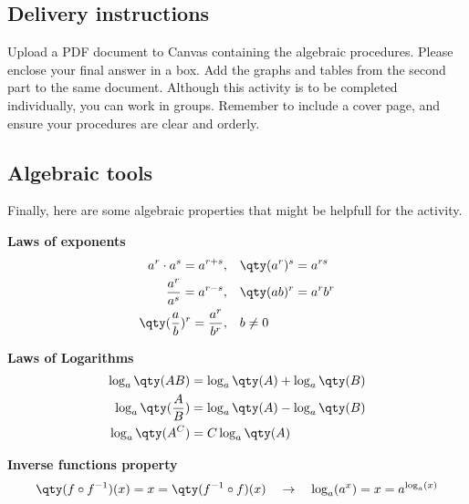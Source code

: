 \documentclass[../main.tex]{subfiles}
\begin{document}
\subsection{Delivery instructions}

Upload a PDF document to Canvas containing the algebraic procedures.
Please enclose your final answer in a box.
Add the graphs and tables from the second part to the same document.
Although this activity is to be completed individually, you can work in groups.
Remember to include a cover page, and ensure your procedures are clear and orderly.

\subsection{Algebraic tools}

Finally, here are some algebraic properties that might be helpfull for the activity.

\begin{minipage}[c]{0.45\textwidth}
    \centering
    {\bfseries\large Laws of exponents}
    \begin{align*}
        a^r\cdot a^s = a^{r+s}, \quad & \qty(a^r)^s = a^{rs} \\
        \frac{a^r}{a^s} = a^{r-s}, \quad & \qty(ab)^r = a^r b^r \\
        \qty(\frac{a}{b})^r = \frac{a^r}{b^r},\quad & b\neq 0
    \end{align*}
\end{minipage}
\begin{minipage}[c]{0.45\textwidth}
    \centering
    {\bfseries\large Laws of Logarithms}
    \begin{align*}
        \log_a\qty(AB) &= \log_a\qty(A) + \log_a\qty(B) \\
        \log_a\qty(\frac{A}{B}) &= \log_a\qty(A) - \log_a\qty(B) \\
        \log_a\qty(A^C) &= C\log_a\qty(A)
    \end{align*}
\end{minipage}

\begin{minipage}[c]{\textwidth}
    \centering
    {\bfseries\large Inverse functions property}
    \begin{gather*}
        \qty(f\circ f^{-1})(x) = x = \qty(f^{-1}\circ f)(x)
        \quad\rightarrow\quad
        \log_a(a^x) = x = a^{\log_a(x)}
    \end{gather*}
\end{minipage}
\end{document}
